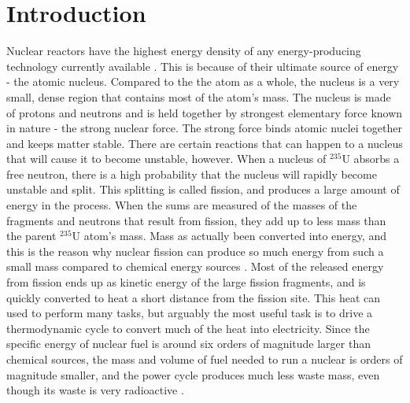 \chapter{Introduction}

Nuclear reactors have the highest energy density of any energy-producing technology currently available \cite{energy_density}.  This is because of their ultimate source of energy - the atomic nucleus.  Compared to the the atom as a whole, the nucleus is a very small, dense region that contains most of the atom's mass.  The nucleus is made of protons and neutrons and is held together by strongest elementary force known in nature - the strong nuclear force. The strong force binds atomic nuclei together and keeps matter stable.  There are certain reactions that can happen to a nucleus that will cause it to become unstable, however.  When a nucleus of $^{235}$U absorbs a free neutron, there is a high probability that the nucleus will rapidly become unstable and split.  This splitting is called fission, and produces a large amount of energy in the process.  When the sums are measured of the masses of the fragments and neutrons that result from fission, they add up to less mass than the parent $^{235}$U atom's mass.  Mass as actually been converted into energy, and this is the reason why nuclear fission can produce so much energy from such a small mass compared to chemical energy sources \cite{krane, duderstadt}.   Most of the released energy from fission ends up as kinetic energy of the large fission fragments, and is quickly converted to heat a short distance from the fission site.  This heat can used to perform many tasks, but arguably the most useful task is to drive a thermodynamic cycle to convert much of the heat into electricity.  Since the specific energy of nuclear fuel is around six orders of magnitude larger than chemical sources, the mass and volume of fuel needed to run a nuclear is orders of magnitude smaller, and the power cycle produces much less waste mass, even though its waste is very radioactive \cite{}.  

